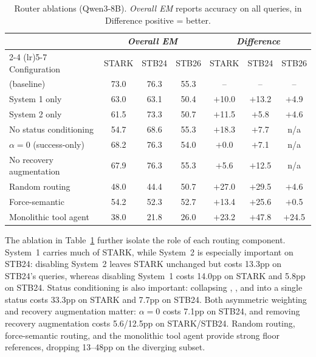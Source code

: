 \begin{table}[t]
\centering
\caption{Router ablations (Qwen3-8B).  \emph{Overall EM} reports accuracy on all queries, in Difference positive = \starname{} better.}
\label{tab:router_ablation}
\small
\setlength{\tabcolsep}{4pt}
\begin{tabular}{l ccc ccc}
\toprule
 & \multicolumn{3}{c}{\emph{Overall EM}} & \multicolumn{3}{c}{\emph{Difference}} \\
\cmidrule(lr){2-4} \cmidrule(lr){5-7}
Configuration & STARK & STB24 & STB26 & STARK & STB24 & STB26 \\
\midrule
\starname{} (baseline)        & 73.0 & 76.3 & 55.3 & --   & --    & --   \\
System 1 only                 & 63.0 & 63.1 & 50.4 & $+$10.0 & $+$13.2 & $+$4.9  \\
System 2 only                 & 61.5 & 73.3 & 50.7 & $+$11.5 & $+$5.8 & $+$4.6 \\
No status conditioning        & 54.7 & 68.6 & 55.3 & $+$18.3 & $+$7.7 & n/a \\
$\alpha = 0$ (success-only)   & 68.2 & 76.3 & 54.0 & $+$0.0 & $+$7.1 & n/a \\
No recovery augmentation      & 67.9 & 76.3 & 55.3 & $+$5.6 & $+$12.5 & n/a \\
Random routing                & 48.0 & 44.4 & 50.7 & $+$27.0 & $+$29.5 & $+$4.6 \\
Force-semantic                & 54.2 & 52.3 & 52.7 & $+$13.4 & $+$25.6 & $+$0.5 \\
Monolithic tool agent         & 38.0 & 21.8 & 26.0 & $+$23.2 & $+$47.8 & $+$24.5 \\
\bottomrule
\end{tabular}
\end{table}

The ablation in Table~\ref{tab:router_ablation} further isolate the role of each routing component.
System~1 carries much of STARK, while System~2 is especially important on STB24: disabling System~2 leaves STARK unchanged but costs 13.3pp on STB24's queries, whereas disabling System~1 costs 14.0pp on STARK and 5.8pp on STB24.
Status conditioning is also important: collapsing \sfail, \sblock, and \smiss{} into a single status costs 33.3pp on STARK and 7.7pp on STB24.
Both asymmetric weighting and recovery augmentation matter: $\alpha=0$ costs 7.1pp on STB24, and removing recovery augmentation costs 5.6/12.5pp on STARK/STB24.
Random routing, force-semantic routing, and the monolithic tool agent provide strong floor references, dropping 13--48pp on the diverging subset.

